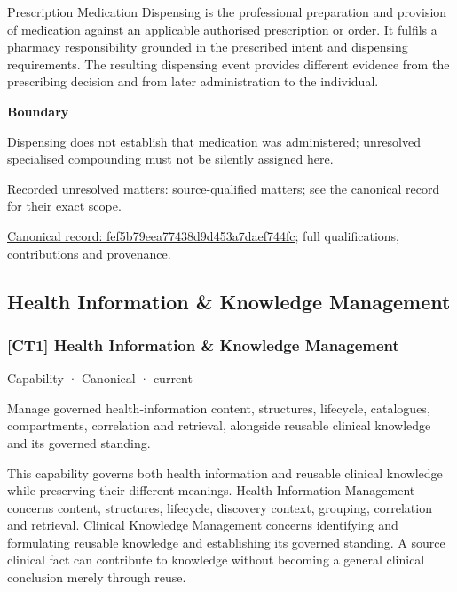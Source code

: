 Prescription Medication Dispensing is the professional preparation and provision of medication against an applicable authorised prescription or order. It fulfils a pharmacy responsibility grounded in the prescribed intent and dispensing requirements. The resulting dispensing event provides different evidence from the prescribing decision and from later administration to the individual.



\textbf{Boundary}



Dispensing does not establish that medication was administered; unresolved specialised compounding must not be silently assigned here.


{\small Recorded unresolved matters: source-qualified matters; see the canonical record for their exact scope.}\par
{\footnotesize \href{../../../../continuum/strategy/capability/fef5b79eea77438d9d453a7daef744fc.md}{Canonical record: fef5b79eea77438d9d453a7daef744fc}; full qualifications, contributions and provenance.}\par
\subsection{Health Information \& Knowledge Management}

\subsubsection{[CT1] Health Information \& Knowledge Management}

\label{element:cca5d5abec204b339eb5b9bd924ed64e}
{\small Capability · Canonical · current}\par

Manage governed health-information content, structures, lifecycle, catalogues, compartments, correlation and retrieval, alongside reusable clinical knowledge and its governed standing.



This capability governs both health information and reusable clinical knowledge while preserving their different meanings. Health Information Management concerns content, structures, lifecycle, discovery context, grouping, correlation and retrieval. Clinical Knowledge Management concerns identifying and formulating reusable knowledge and establishing its governed standing. A source clinical fact can contribute to knowledge without becoming a general clinical conclusion merely through reuse.



